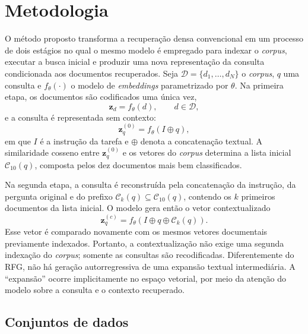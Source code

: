 \section{Metodologia}
\label{sec:ctx-emb-metodologia}

O método proposto transforma a recuperação densa convencional em um processo de dois estágios no qual o mesmo modelo é empregado para indexar o \textit{corpus}, executar a busca inicial e produzir uma nova representação da consulta condicionada aos documentos recuperados. Seja $\mathcal{D}=\{d_1,\ldots,d_N\}$ o \textit{corpus}, $q$ uma consulta e $f_{\theta}(\cdot)$ o modelo de \textit{embeddings} parametrizado por $\theta$. Na primeira etapa, os documentos são codificados uma única vez,
\begin{equation}
    \mathbf{z}_{d}=f_{\theta}(d), \qquad d\in\mathcal{D},
\end{equation}
e a consulta é representada sem contexto:
\begin{equation}
    \mathbf{z}^{(0)}_{q}=f_{\theta}(I \oplus q),
\end{equation}
em que $I$ é a instrução da tarefa e $\oplus$ denota a concatenação textual. A similaridade cosseno entre $\mathbf{z}^{(0)}_{q}$ e os vetores do \textit{corpus} determina a lista inicial $\mathcal{C}_{10}(q)$, composta pelos dez documentos mais bem classificados.

Na segunda etapa, a consulta é reconstruída pela concatenação da instrução, da pergunta original e do prefixo $\mathcal{C}_{k}(q)\subseteq\mathcal{C}_{10}(q)$, contendo os $k$ primeiros documentos da lista inicial. O modelo gera então o vetor contextualizado
\begin{equation}
    \mathbf{z}^{(c)}_{q}
    =
    f_{\theta}\left(I\oplus q\oplus\mathcal{C}_{k}(q)\right).
\end{equation}
Esse vetor é comparado novamente com os mesmos vetores documentais previamente indexados. Portanto, a contextualização não exige uma segunda indexação do \textit{corpus}; somente as consultas são recodificadas. Diferentemente do RFG, não há geração autorregressiva de uma expansão textual intermediária. A ``expansão'' ocorre implicitamente no espaço vetorial, por meio da atenção do modelo sobre a consulta e o contexto recuperado.

\subsection{Conjuntos de dados}
\label{subsec:ctx-emb-dados}

